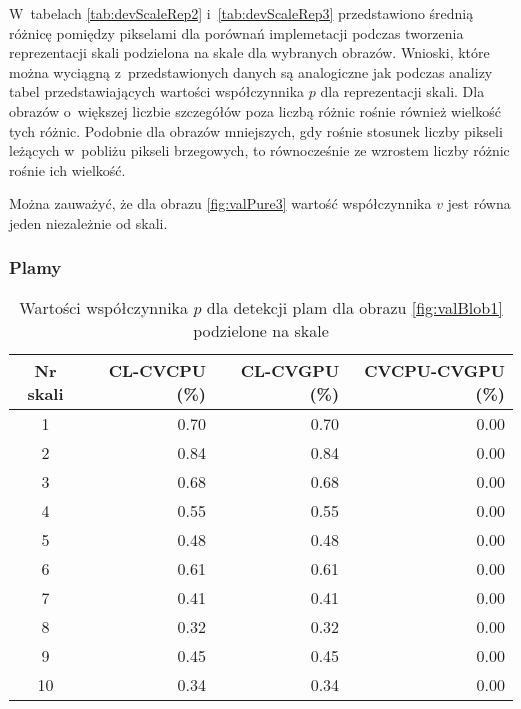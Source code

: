 W~tabelach \ref{tab:devScaleRep2} i~\ref{tab:devScaleRep3} przedstawiono średnią różnicę pomiędzy pikselami dla porównań implemetacji podczas tworzenia reprezentacji skali podzielona na skale dla wybranych obrazów. Wnioski, które można wyciągną z~przedstawionych danych są analogiczne jak podczas analizy tabel przedstawiających wartości współczynnika $ p $ dla reprezentacji skali. Dla obrazów o~większej liczbie szczegółów poza liczbą różnic rośnie również wielkość tych różnic. Podobnie dla obrazów mniejszych, gdy rośnie stosunek liczby pikseli leżących w~pobliżu pikseli brzegowych, to równocześnie ze wzrostem liczby różnic rośnie ich wielkość.

Można zauważyć, że dla obrazu \ref{fig:valPure3} wartość współczynnika $ v $ jest równa jeden niezależnie od skali.

\subsubsection{Plamy}
\label{subsubsec:plamyTabele}

\begin{center}
\begin{table}
\centering
\caption{Wartości współczynnika $ p $ dla detekcji plam dla obrazu \ref{fig:valBlob1} podzielone na skale}
\label{tab:imageScaleBlob1}
\begin{tabular}{|c|r|r|r|}
 \hline
Nr skali & CL-CVCPU (\%) & CL-CVGPU (\%) & CVCPU-CVGPU (\%) \\ \hline
1        & 0.70     & 0.70     & 0.00        \\ \hline
2        & 0.84     & 0.84     & 0.00       \\ \hline
3        & 0.68     & 0.68     & 0.00       \\ \hline
4        & 0.55     & 0.55     & 0.00        \\ \hline
5        & 0.48     & 0.48     & 0.00        \\ \hline
6        & 0.61     & 0.61     & 0.00        \\ \hline
7        & 0.41     & 0.41     & 0.00        \\ \hline
8        & 0.32     & 0.32     & 0.00        \\ \hline
9        & 0.45     & 0.45     & 0.00        \\ \hline
10       & 0.34     & 0.34     & 0.00        \\ \hline
\end{tabular}
\end{table}
\end{center}

